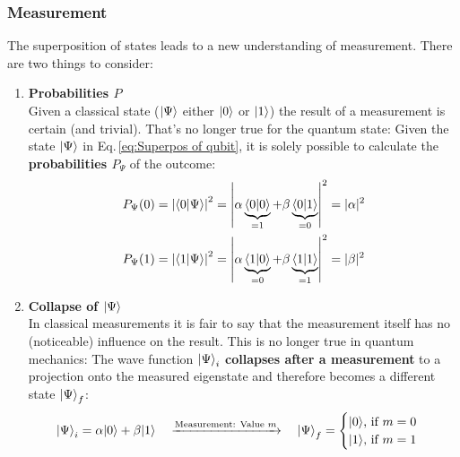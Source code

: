 \documentclass[bibliography=totocnumbered]{article}
\theoremstyle{NoticeStyle}
\begin{document}
\subsubsection{Measurement}
The superposition of states leads to a new understanding of measurement. There are two things to consider:
\begin{enumerate}
	\item \textbf{Probabilities $P$}\\
	Given a classical state (${\left\vert{\Psi}\right\rangle}$ either ${\left\vert{0}\right\rangle}$ or ${\left\vert{1}\right\rangle}$) the result of a measurement is certain (and trivial). That's no longer true for the quantum state: Given the state ${\left\vert{\Psi}\right\rangle}$ in Eq.\,\ref{eq:Superpos of qubit}, it is solely possible to calculate the \textbf{probabilities $P_\Psi$} of the outcome:
	\begin{align}
		P_\Psi(0) = \left|\braket{0}{\Psi}\right|^2 &= \left|   \alpha \underbrace{\braket{0}{0}}_{=1} + \beta \underbrace{\braket{0}{1}}_{=0}   \right|^2 = |\alpha|^2\\
		P_\Psi(1) = \left|\braket{1}{\Psi}\right|^2 &= \left|   \alpha \underbrace{\braket{1}{0}}_{=0} + \beta \underbrace{\braket{1}{1}}_{=1}   \right|^2 = |\beta|^2
	\end{align}
	
	\item \textbf{Collapse of ${\left\vert{\Psi}\right\rangle}$}\\
	In classical measurements it is fair to say that the measurement itself has no (noticeable) influence on the result. This is no longer true in quantum mechanics: The wave function ${\left\vert{\Psi}\right\rangle}_i$ \textbf{collapses after a measurement} to a projection onto the measured eigenstate and therefore becomes a different state ${\left\vert{\Psi}\right\rangle}_f$:
	\begin{align}
		{\left\vert{\Psi}\right\rangle}_i = \alpha {\left\vert{0}\right\rangle} + \beta {\left\vert{1}\right\rangle}
		\quad
		\xrightarrow{\text{Measurement:  Value } m}
		\quad
		{\left\vert{\Psi}\right\rangle}_f=
		\begin{cases}
			{\left\vert{0}\right\rangle} \text{,  if } m=0\\
			{\left\vert{1}\right\rangle} \text{,  if } m=1
		\end{cases}
	\end{align}

\end{enumerate}
\end{document}
